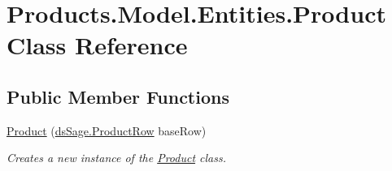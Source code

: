 \hypertarget{class_products_1_1_model_1_1_entities_1_1_product}{}\section{Products.\+Model.\+Entities.\+Product Class Reference}
\label{class_products_1_1_model_1_1_entities_1_1_product}
\subsection*{Public Member Functions}
\begin{DoxyCompactItemize}
\item 
\hyperlink{class_products_1_1_model_1_1_entities_1_1_product_a919c60d5374069b61fe5eb6699e7f932}{Product} (\hyperlink{class_products_1_1_data_1_1ds_sage_1_1_product_row}{ds\+Sage.\+Product\+Row} base\+Row)
\begin{DoxyCompactList}\small\item\em Creates a new instance of the \hyperlink{class_products_1_1_model_1_1_entities_1_1_product}{Product} class. \end{DoxyCompactList}\end{DoxyCompactItemize}
